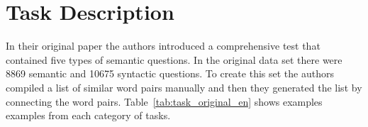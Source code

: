 








\section{Task Description}
\label{sec:task_description}



In their original paper \cite{DBLP:journals/corr/abs-1301-3781} the authors
introduced a comprehensive test that contained five types of semantic
questions. In the original data set  there were 8869 semantic and 10675
syntactic questions. To create this set the authors compiled a list of
similar word pairs manually and then they generated the list by
connecting the word pairs. Table~\ref{tab:task_original_en} shows examples 
examples from each category of tasks. 

